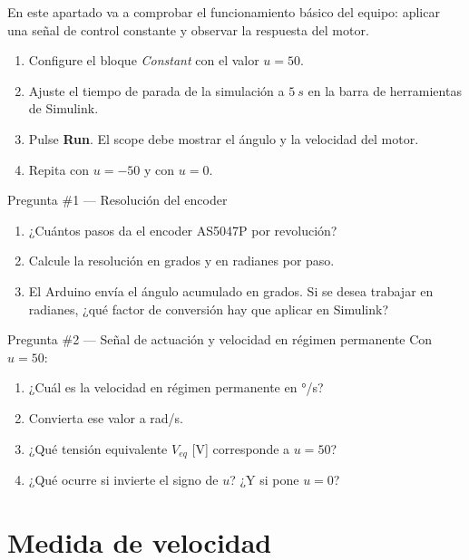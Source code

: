 \documentclass[12pt,a4paper]{article}
\begin{document}
En este apartado va a comprobar el funcionamiento básico del equipo: aplicar una
señal de control constante y observar la respuesta del motor.

\begin{enumerate}
  \item Configure el bloque \emph{Constant} con el valor $u = 50$.
  \item Ajuste el tiempo de parada de la simulación a $\SI{5}{s}$ en la barra de
        herramientas de Simulink.
  \item Pulse \textbf{Run}. El scope debe mostrar el ángulo y la velocidad del motor.
  \item Repita con $u = -50$ y con $u = 0$.
\end{enumerate}

\begin{pregunta}{Pregunta \#1 — Resolución del encoder}
  \begin{enumerate}[label=\alph*)]
    \item ¿Cuántos pasos da el encoder AS5047P por revolución?
    \item Calcule la resolución en grados y en radianes por paso.
    \item El Arduino envía el ángulo acumulado en grados. Si se desea trabajar en
          radianes, ¿qué factor de conversión hay que aplicar en Simulink?
  \end{enumerate}
\end{pregunta}

\begin{pregunta}{Pregunta \#2 — Señal de actuación y velocidad en régimen permanente}
  Con $u = 50$:
  \begin{enumerate}[label=\alph*)]
    \item ¿Cuál es la velocidad en régimen permanente en °/s?
    \item Convierta ese valor a rad/s.
    \item ¿Qué tensión equivalente $V_{eq}$ [V] corresponde a $u = 50$?
    \item ¿Qué ocurre si invierte el signo de $u$? ¿Y si pone $u = 0$?
  \end{enumerate}
\end{pregunta}

\section{Medida de velocidad}
\end{document}
